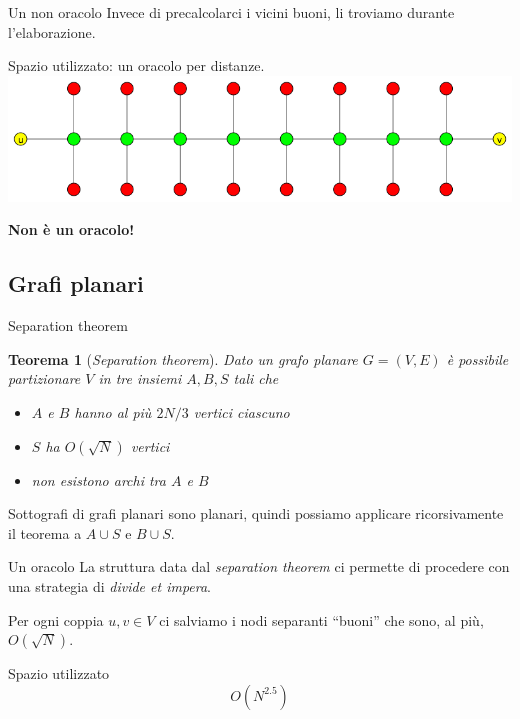 \documentclass{beamer}
\newcounter{counter1}
\theoremstyle{plain}
\newtheorem{myteo}[counter1]{Teorema}
\theoremstyle{definition}
\theoremstyle{remark}
\newcommand{\pa}[1]{\left(#1\right)}
\begin{document}
\begin{frame}{Un non oracolo}
  Invece di precalcolarci i vicini buoni, li troviamo durante
  l'elaborazione.
  
  Spazio utilizzato: un oracolo per distanze.
  \vfill
  \pause
  \includegraphics[width=\textwidth]{millepiedi}
  
  \begin{center}
    \textbf{Non \`e un oracolo!}
  \end{center}
\end{frame}

\subsection{Grafi planari}

\begin{frame}{Separation theorem}
  \begin{myteo}[\textit{Separation theorem}]
    Dato un grafo planare $G = (V,E)$ \`e possibile partizionare $V$
    in tre insiemi $A,B,S$ tali che
    \begin{itemize}
    \item $A$ e $B$ hanno al pi\`u $2N/3$ vertici ciascuno
    \item $S$ ha $O\pa{ \sqrt{N}}$ vertici
    \item non esistono archi tra $A$ e $B$
    \end{itemize}
  \end{myteo}
  \vfill
  \pause
  Sottografi di grafi planari sono planari, quindi possiamo applicare
  ricorsivamente il teorema a $A\cup S$ e $B\cup S$.
\end{frame}

\begin{frame}{Un oracolo}
  La struttura data dal \textit{separation theorem} ci permette di
  procedere con una strategia di \textit{divide et impera}.
  \vfill \pause

  Per ogni coppia $u,v\in V$ ci salviamo i nodi separanti ``buoni''
  che sono, al pi\`u, $O\pa{\sqrt{N}}$.
  \vfill \pause

  \begin{block}{Spazio utilizzato}
    \[ O \pa{N^{2.5}} \]
  \end{block}
\end{frame}
\end{document}
